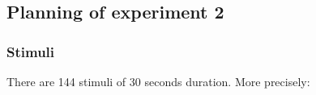 \documentclass[12pt]{elsarticle}
\providecommand{\DIFaddbegin}{} %
\providecommand{\DIFaddend}{} %
\begin{document}
\DIFaddbegin 

\DIFaddend \subsection{Planning of experiment 2}


\subsubsection*{Stimuli}

\DIFaddbegin 

\DIFaddend %

There are 144 stimuli of 30 seconds duration. More precisely:

\DIFaddbegin 
\end{document}
